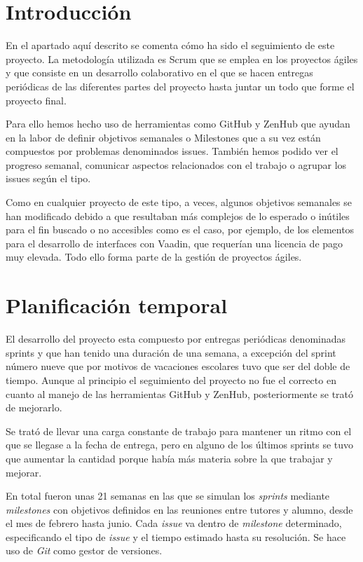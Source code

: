 
\section{Introducción}

En el apartado aquí descrito se comenta cómo ha sido el seguimiento de este  proyecto. La metodología utilizada es Scrum que se emplea en los proyectos ágiles y que consiste en un desarrollo colaborativo en el que se hacen entregas periódicas de las diferentes partes del proyecto hasta juntar un todo que forme el proyecto final. 

Para ello hemos hecho uso de herramientas como GitHub y ZenHub que ayudan en la labor de definir objetivos semanales o Milestones que a su vez están compuestos por problemas denominados issues. También hemos podido ver el progreso semanal, comunicar aspectos relacionados con el trabajo o agrupar los issues según el tipo.

Como en cualquier proyecto de este tipo, a veces, algunos objetivos semanales se han modificado debido a que resultaban más complejos de lo esperado o inútiles para el fin buscado o no accesibles como es el caso, por ejemplo, de los elementos para el desarrollo de interfaces con Vaadin, que requerían una licencia de pago muy elevada. Todo ello forma parte de la gestión de proyectos ágiles.

\section{Planificación temporal}

El desarrollo del proyecto esta compuesto por entregas periódicas denominadas sprints y que han tenido una duración de una semana, a excepción del sprint número nueve que por motivos de vacaciones escolares tuvo que ser del doble de tiempo. Aunque al principio el seguimiento del proyecto no fue el correcto en cuanto al manejo de las herramientas GitHub  y ZenHub, posteriormente se trató de mejorarlo.

Se trató de llevar una carga constante de trabajo para mantener un ritmo con el que se llegase a la fecha de entrega, pero en alguno de los últimos sprints se tuvo que aumentar la cantidad porque había más materia sobre la que trabajar y mejorar.

En total fueron unas 21 semanas en las que se simulan los \emph{sprints} mediante \emph{milestones} con objetivos definidos en las reuniones entre tutores y alumno, desde el mes de febrero hasta junio. Cada \emph{issue} va dentro de \emph{milestone} determinado, especificando el tipo de \emph{issue} y el tiempo estimado hasta su resolución. Se hace uso de \emph{Git} como gestor de versiones. 

